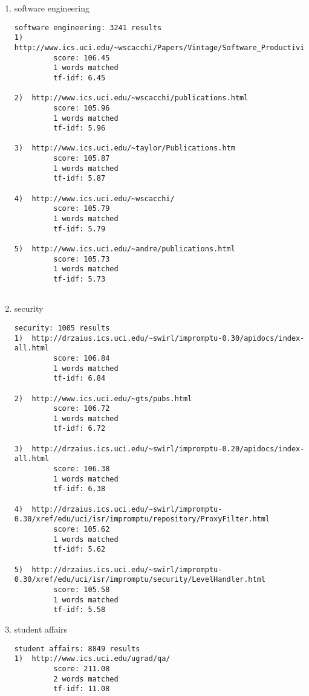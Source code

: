 \documentclass[paper=a4, fontsize=11pt]{scrartcl} %
\numberwithin{equation}{section} %
\numberwithin{table}{section} %
\begin{document}
\begin{enumerate}
\item software engineering
\begin{small}
\begin{verbatim}
software engineering: 3241 results
1)  http://www.ics.uci.edu/~wscacchi/Papers/Vintage/Software_Productivity.html 
         score: 106.45 
         1 words matched 
         tf-idf: 6.45

2)  http://www.ics.uci.edu/~wscacchi/publications.html 
         score: 105.96 
         1 words matched 
         tf-idf: 5.96

3)  http://www.ics.uci.edu/~taylor/Publications.htm 
         score: 105.87 
         1 words matched 
         tf-idf: 5.87

4)  http://www.ics.uci.edu/~wscacchi/ 
         score: 105.79 
         1 words matched 
         tf-idf: 5.79

5)  http://www.ics.uci.edu/~andre/publications.html 
         score: 105.73 
         1 words matched 
         tf-idf: 5.73


\end{verbatim}
\end{small}

\item security
\begin{small}
\begin{verbatim}
security: 1005 results
1)  http://drzaius.ics.uci.edu/~swirl/impromptu-0.30/apidocs/index-all.html 
         score: 106.84 
         1 words matched 
         tf-idf: 6.84

2)  http://www.ics.uci.edu/~gts/pubs.html 
         score: 106.72 
         1 words matched 
         tf-idf: 6.72

3)  http://drzaius.ics.uci.edu/~swirl/impromptu-0.20/apidocs/index-all.html 
         score: 106.38 
         1 words matched 
         tf-idf: 6.38

4)  http://drzaius.ics.uci.edu/~swirl/impromptu-0.30/xref/edu/uci/isr/impromptu/repository/ProxyFilter.html 
         score: 105.62 
         1 words matched 
         tf-idf: 5.62

5)  http://drzaius.ics.uci.edu/~swirl/impromptu-0.30/xref/edu/uci/isr/impromptu/security/LevelHandler.html 
         score: 105.58 
         1 words matched 
         tf-idf: 5.58

\end{verbatim}
\end{small}

\item student affairs
\begin{small}
\begin{verbatim}
student affairs: 8849 results
1)  http://www.ics.uci.edu/ugrad/qa/ 
         score: 211.08 
         2 words matched 
         tf-idf: 11.08


\end{verbatim}
\end{small}
\end{enumerate}
\end{document}
